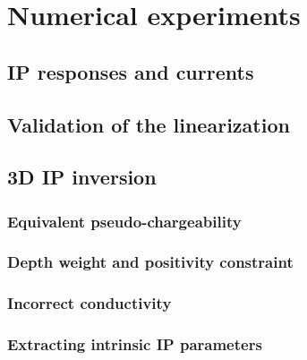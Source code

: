 \documentclass[a4paper, 11pt]{article}
\begin{document}
\section{Numerical experiments}

\subsection{IP responses and currents}



\subsection{Validation of the linearization}



\subsection{3D IP inversion}



\subsubsection{Equivalent pseudo-chargeability}



\subsubsection{Depth weight and positivity constraint}



\subsubsection{Incorrect conductivity}



\subsubsection{Extracting intrinsic IP parameters}





\end{document}
